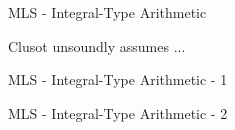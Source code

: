 
\begin{frame}{MLS - Integral-Type Arithmetic}

\vspace*{-0.4cm}

Clusot unsoundly assumes ...

\end{frame}


\begin{frame}[fragile]{MLS - Integral-Type Arithmetic - 1}
\vspace*{-0.4cm}
\only<1>{}
\end{frame}


\begin{frame}[fragile]{MLS - Integral-Type Arithmetic - 2}
\vspace*{-0.4cm}
\only<1>{}
\end{frame}

